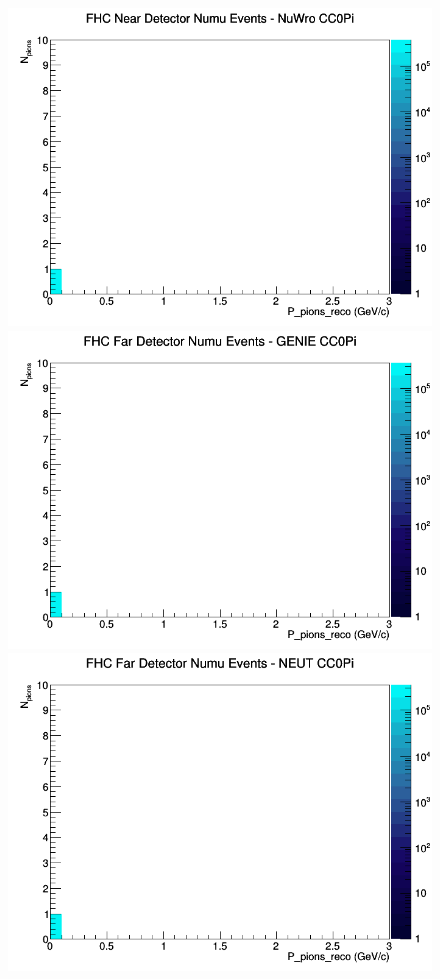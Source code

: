 \documentclass[12pt]{article}
\begin{document}
\begin{figure}[h]
\includegraphics[width=\linewidth]{eff_N_P/GAr/pions/CC0Pi_FHC_ND_numu_N_P_NuWro.png}
\endminipage
\newline
{}
\includegraphics[width=\linewidth]{eff_N_P/GAr/pions/CC0Pi_FHC_FD_numu_N_P_GENIE.png}
\endminipage
{}
\includegraphics[width=\linewidth]{eff_N_P/GAr/pions/CC0Pi_FHC_FD_numu_N_P_NEUT.png}

\end{figure}
\end{document}
